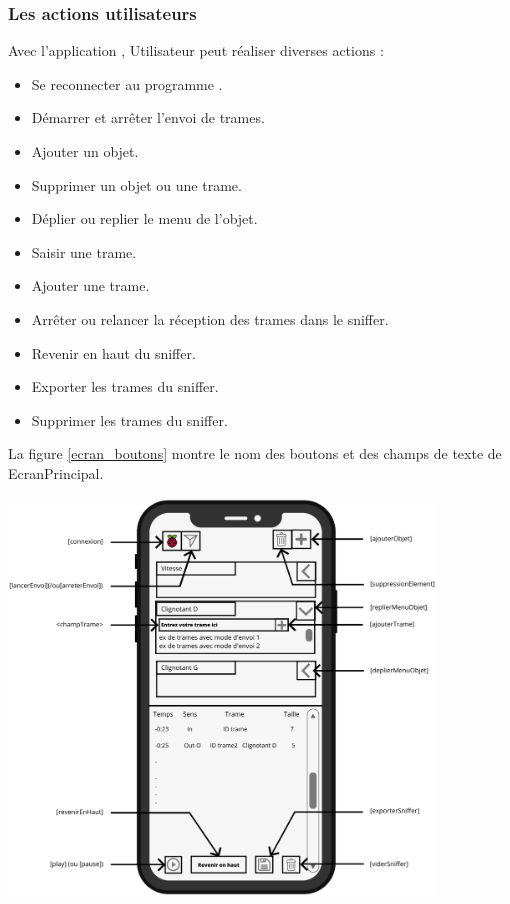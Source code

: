 \subsubsection{Les actions utilisateurs}
Avec l'application {\nomApplication}, Utilisateur peut réaliser diverses actions :
\begin{itemize}
    \item Se reconnecter au programme {\nomLogiciel}.
    \item Démarrer et arrêter l'envoi de trames.
    \item Ajouter un objet.
    \item Supprimer un objet ou une trame.
    \item Déplier ou replier le menu de l'objet.
    \item Saisir une trame.
    \item Ajouter une trame.
    \item Arrêter ou relancer la réception des trames dans le sniffer.
    \item Revenir en haut du sniffer.
    \item Exporter les trames du sniffer.
    \item Supprimer les trames du sniffer.
\end{itemize}
\medskip
La figure \ref{ecran_boutons} montre le nom des boutons et des champs de texte de EcranPrincipal.
\begin{minipage}{1\linewidth}
    \centering
    \includegraphics[width=0.85\textwidth]{sections/3_Exigences_specifiques/1_IHM/ihm/ecranPrincipalDescription.png}
    \label{ecran_boutons}
\end{minipage} \newline \medskip \medskip


